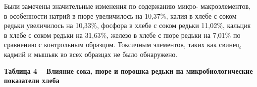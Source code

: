 Были замечены значительные изменения по содержанию микро-
макроэлементов, в особенности натрий в пюре увеличилось на 10,37\%,
калия в хлебе с соком редьки увеличилось на 10,33\%, фосфора в хлебе с
соком редьки 11,02\%, кальция в хлебе с соком редьки на 31,63\%, железо
в хлебе с пюре редьки на 7,01\% по сравнению с контрольным образцом.
Токсичным элементов, таких как свинец, кадмий и мышьяк во всех образцах
не было обнаружено.

{\bfseries Таблица 4 -- Влияние сока, пюре и порошка редьки на
микробиологические показатели хлеба}


